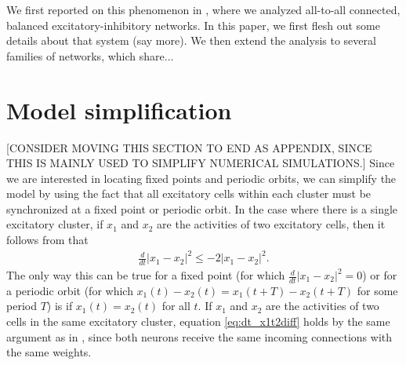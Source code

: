 \documentclass[11pt,reqno]{amsart}
\begin{document}
We first reported on this phenomenon in \cite{Barreiro2017}, where we analyzed all-to-all connected, balanced excitatory-inhibitory networks. In this paper, we first flesh out some details about that system (say more). We then extend the analysis to several families of networks, which share...

\section{Model simplification}

[CONSIDER MOVING THIS SECTION TO END AS APPENDIX, SINCE THIS IS MAINLY USED TO SIMPLIFY NUMERICAL SIMULATIONS.]
Since we are interested in locating fixed points and periodic orbits, we can simplify the model by using the fact that all excitatory cells within each cluster must be synchronized at a fixed point or periodic orbit. In the case where there is a single excitatory cluster, if $x_1$ and $x_2$ are the activities of two excitatory cells, then it follows from \cite{Barreiro2017} that
\begin{align}\label{eq:dt_x1t2diff}
\frac{d}{dt}|x_1 - x_2|^2 \leq -2 |x_1 - x_2 |^2.
\end{align}
The only way this can be true for a fixed point (for which $\frac{d}{dt} |x_1 - x_2|^2 =0$) or for a periodic orbit (for which $x_1(t)-x_2(t) = x_1(t+T)-x_2(t+T)$ for some period $T$) is if $x_1(t) = x_2(t)$ for all $t$. If $x_1$ and $x_2$ are the activities of two cells in the same excitatory cluster, equation \cref{eq:dt_x1t2diff} holds by the same argument as in \cite{Barreiro2017}, since both neurons receive the same incoming connections with the same weights. 
\end{document}
